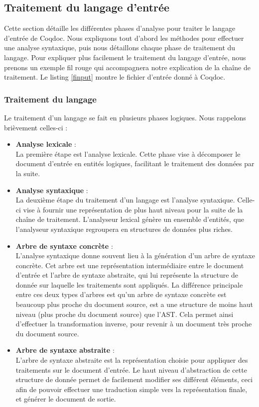\documentclass[a4paper, 11pt]{report}
\begin{document}
    \subsection{Traitement du langage d'entrée}
    Cette section détaille les différentes phases d'analyse pour traiter le
    langage d'entrée de Coqdoc. Nous expliquons tout d'abord les méthodes
    pour effectuer une analyse syntaxique, puis nous détaillons chaque phase
    de traitement du langage.
    Pour expliquer plus facilement le traitement du langage d'entrée, nous
    prenons un exemple fil rouge qui accompagnera notre explication de la
    chaîne de traitement. Le listing \ref{finput} montre le fichier d'entrée
    donné à Coqdoc.
    

    \subsubsection{Traitement du langage}
    \label{trait}
    Le traitement d'un langage se fait en plusieurs phases logiques. Nous
    rappelons brièvement celles-ci :
    \begin{itemize}
    \item[] \textbf{Analyse lexicale}  :\\
      La première étape est l'analyse lexicale. Cette phase vise à décomposer
      le document d'entrée en entités logiques, facilitant le traitement
      des données par la suite.
    \item[] \textbf{Analyse syntaxique} :\\
      La deuxième étape du traitement d'un langage est l'analyse syntaxique.
      Celle-ci vise à fournir une représentation de plus haut niveau pour
      la suite de la chaîne de traitement. L'analyseur lexical génère un
      ensemble d'entités, que l'analyseur syntaxique regroupera en structures
      de données plus riches.
      \item[] \textbf{Arbre de syntaxe concrète} :\\
      L'analyse syntaxique donne souvent lieu à la génération d'un arbre
      de syntaxe concrète. Cet arbre est une représentation intermédiaire
      entre le document d'entrée et l'arbre de syntaxe abstraite, qui
      lui représente la structure de donnée sur laquelle les traitements sont
      appliqués. La différence principale entre ces deux types d'arbres est
      qu'un arbre de syntaxe concrète est beaucoup plus proche du document
      source, est a une structure de moins haut niveau (plus proche du
      document source) que l'AST.  Cela permet ainsi d'effectuer la
      transformation inverse, pour revenir à un document très proche du
      document source.
      \item[] \textbf{Arbre de syntaxe abstraite} :\\
      L'arbre de syntaxe abstraite est la représentation choisie pour appliquer
      des traitements sur le document d'entrée. Le haut niveau d'abstraction
      de cette structure de donnée permet de facilement modifier ses différent
      éléments, ceci afin de pouvoir effectuer une traduction simple vers la
      représentation finale, et générer le document de sortie.
    \end{itemize}
\end{document}
